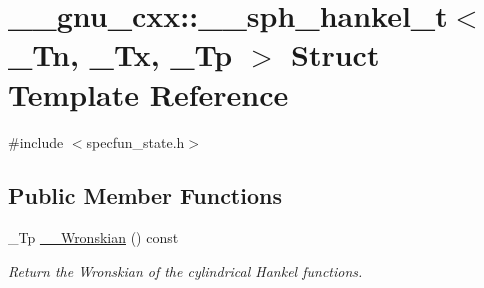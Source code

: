\hypertarget{struct____gnu__cxx_1_1____sph__hankel__t}{}\section{\+\_\+\+\_\+gnu\+\_\+cxx\+:\+:\+\_\+\+\_\+sph\+\_\+hankel\+\_\+t$<$ \+\_\+\+Tn, \+\_\+\+Tx, \+\_\+\+Tp $>$ Struct Template Reference}
\label{struct____gnu__cxx_1_1____sph__hankel__t}


{\ttfamily \#include $<$specfun\+\_\+state.\+h$>$}

\subsection*{Public Member Functions}
\begin{DoxyCompactItemize}
\item 
\+\_\+\+Tp \hyperlink{struct____gnu__cxx_1_1____sph__hankel__t_af41b6b095537761aeff90ac699e189c2}{\+\_\+\+\_\+\+Wronskian} () const 
\begin{DoxyCompactList}\small\item\em Return the Wronskian of the cylindrical Hankel functions. \end{DoxyCompactList}\end{DoxyCompactItemize}
